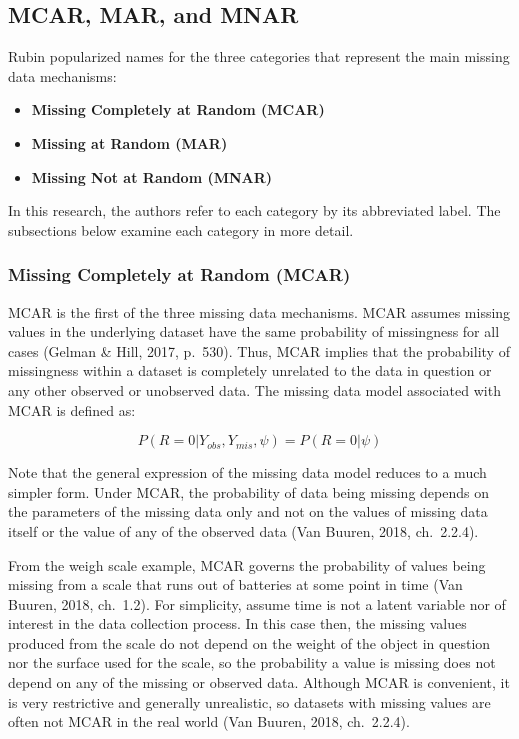 \documentclass[12pt,oneside]{chicagocapstone}
\providecommand{\tightlist}{%
  \setlength{\itemsep}{0pt}\setlength{\parskip}{0pt}}
\begin{document}
\subsection*{MCAR, MAR, and MNAR}\label{background-mcar-mar-mnar}

Rubin popularized names for the three categories that represent the main
missing data mechanisms:
\begin{itemize}
\tightlist
\item
  \textbf{Missing Completely at Random (MCAR)}
\item
  \textbf{Missing at Random (MAR)}
\item
  \textbf{Missing Not at Random (MNAR)}
\end{itemize}
In this research, the authors refer to each category by its abbreviated
label. The subsections below examine each category in more detail.

\subsubsection*{Missing Completely at Random (MCAR)}\label{mcar}

MCAR is the first of the three missing data mechanisms. MCAR assumes
missing values in the underlying dataset have the same probability of
missingness for all cases (Gelman \& Hill, 2017, p.~530). Thus, MCAR
implies that the probability of missingness within a dataset is
completely unrelated to the data in question or any other observed or
unobserved data. The missing data model associated with MCAR is defined
as:

\[P(R=0|Y_{obs},Y_{mis},\psi) = P(R=0|\psi)\]

Note that the general expression of the missing data model reduces to a
much simpler form. Under MCAR, the probability of data being missing
depends on the parameters of the missing data only and not on the values
of missing data itself or the value of any of the observed data (Van
Buuren, 2018, ch.~2.2.4).

From the weigh scale example, MCAR governs the probability of values
being missing from a scale that runs out of batteries at some point in
time (Van Buuren, 2018, ch.~1.2). For simplicity, assume time is not a
latent variable nor of interest in the data collection process. In this
case then, the missing values produced from the scale do not depend on
the weight of the object in question nor the surface used for the scale,
so the probability a value is missing does not depend on any of the
missing or observed data. Although MCAR is convenient, it is very
restrictive and generally unrealistic, so datasets with missing values
are often not MCAR in the real world (Van Buuren, 2018, ch.~2.2.4).
\end{document}
